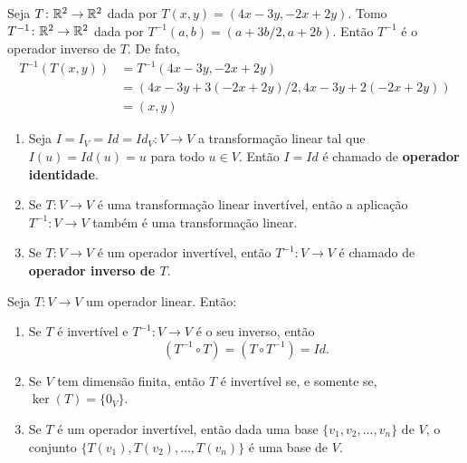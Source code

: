 \begin{exemplo}
  Seja $T \colon \mathbb{R}^2 \to \mathbb{R}^2$ dada por $T(x, y) = (4x - 3y, -2x + 2y)$. Tomo $T^{-1} \colon \mathbb{R}^2 \to \mathbb{R}^2$ dada por $T^{-1}(a, b) = (a + 3b/2, a + 2b)$. Então $T^{-1}$ é o operador inverso de $T$. De fato,
  \begin{align*}
    T^{-1}(T(x, y)) &= T^{-1}(4x - 3y, -2x + 2y) \\ &= (4x - 3y + 3(-2x + 2y)/2, 4x - 3y + 2(-2x + 2y)) \\ &= (x, y)
  \end{align*}
\end{exemplo}
\begin{observacoes}
  \begin{enumerate}[label={\roman*})]
    \item Seja $I = I_V = Id = Id_V \colon V \to V$  a transformação linear tal que $I(u) = Id(u) = u$  para todo $u \in V$.  Então $I = Id$ é chamado de \textbf{operador identidade}.

    \item Se $T \colon V \to V$ é uma transformação linear invertível,  então a aplicação $T^{-1} \colon V \to V$ também é uma transformação linear.

    \item Se $T \colon V \to V$ é um operador invertível,  então $T^{-1} \colon V \to V$ é chamado de \textbf{operador inverso de $T$}.
  \end{enumerate}
\end{observacoes}

\begin{proposicao}
  Seja $T \colon V \to V$ um operador linear.  Então:
  \begin{enumerate}[label={\roman*})]
    \item Se $T$ é invertível  e $T^{-1} \colon V \to V$ é o seu inverso,  então
        \[
            (T^{-1} \circ T) =  (T \circ T^{-1}) =  Id.
        \]

    \item Se $V$ tem dimensão finita,  então $T$ é invertível  se, e somente se,  $\ker(T) = \{0_V\}$.

    \item Se $T$ é um operador invertível,  então dada uma base $\{v_1, v_2, \dots, v_n\}$ de $V$,  o conjunto $\{T(v_1),  T(v_2),  \dots, T(v_n)\}$  é uma base de $V$.
  \end{enumerate}
\end{proposicao}

